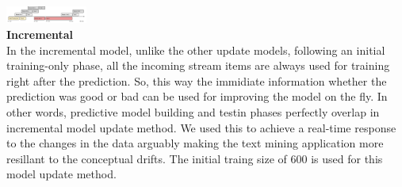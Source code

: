 \\
\\
\includegraphics[width=0.2\textwidth]{./time_models/Errortriggered}\\
\textbf{\large Incremental}\\
In the incremental model, unlike the other update models, following an initial training-only phase, all the incoming stream items are always used for training right after the prediction. So, this way the immidiate information whether the prediction was good or bad can be used for improving the model on the fly. In other words, predictive model building and testin phases perfectly overlap in incremental model update method. We used this to achieve a real-time response to the changes in the data arguably making the text mining application more resillant to the conceptual drifts. The initial traing size of 600 is used for this model update method.

